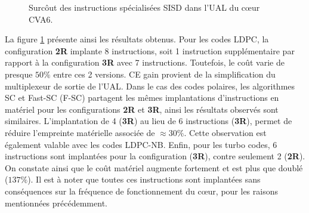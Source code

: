 \documentclass[../main.tex]{subfiles}
\begin{document}
\begin{figure}
    \center
    \caption{Surcôut des instructions spécialisées SISD dans l'UAL du cœur CVA6.}
    \label{tikz:alu_sisd}
\end{figure}
La figure \ref{tikz:alu_sisd} présente ainsi les résultats obtenus. 
Pour les codes LDPC, la configuration \textbf{2R} implante 8 instructions, soit 1 instruction supplémentaire par rapport à la configuration \textbf{3R} avec 7 instructions. Toutefois, le coût varie de presque $50\%$ entre ces 2 versions. CE gain provient de la simplification du multiplexeur de sortie de l'UAL.
Dans le cas des codes polaires, les algorithmes SC et Fast-SC (F-SC) partagent les mêmes implantations d'instructions en matériel pour les configurations \textbf{2R} et \textbf{3R}, ainsi les résultats observés sont similaires. L'implantation de 4 (\textbf{3R}) au lieu de 6 instructions (\textbf{3R}), permet de réduire l'empreinte matérielle associée de $\approx 30\%$.
Cette observation est également valable avec les codes LDPC-NB.
Enfin, pour les turbo codes, 6 instructions sont implantées pour la configuration (\textbf{3R}), contre seulement 2 (\textbf{2R}). On constate ainsi que le coût matériel augmente fortement et est plus que doublé ($137\%$). 
Il est à noter que toutes ces instructions sont implantées sans conséquences sur la fréquence de fonctionnement du cœur, pour les raisons mentionnées précédemment.
\end{document}
